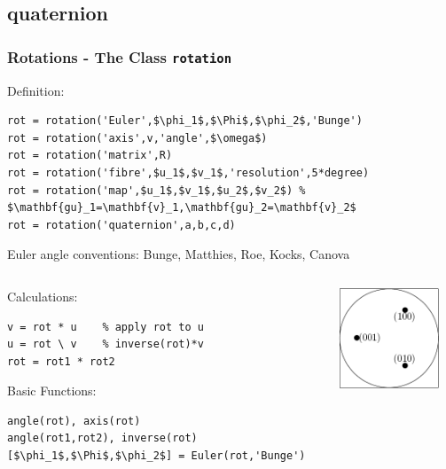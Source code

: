 \subsection*{quaternion}


\begin{frame}[fragile]
  \frametitle{Rotations - The \MTEX Class \texttt{\bf rotation}}

Definition:

\begin{lstlisting}[mathescape=true]
rot = rotation('Euler',$\phi_1$,$\Phi$,$\phi_2$,'Bunge')
rot = rotation('axis',v,'angle',$\omega$)
rot = rotation('matrix',R)
rot = rotation('fibre',$u_1$,$v_1$,'resolution',5*degree)
rot = rotation('map',$u_1$,$v_1$,$u_2$,$v_2$) % $\mathbf{gu}_1=\mathbf{v}_1,\mathbf{gu}_2=\mathbf{v}_2$
rot = rotation('quaternion',a,b,c,d)
\end{lstlisting}

Euler angle conventions: Bunge, Matthies, Roe, Kocks, Canova


\begin{columns}
  \begin{column}{8.5cm}

    Calculations:

\begin{lstlisting}
v = rot * u    % apply rot to u
u = rot \ v    % inverse(rot)*v
rot = rot1 * rot2
\end{lstlisting}

    Basic Functions:

\begin{lstlisting}[mathescape=true]
angle(rot), axis(rot)
angle(rot1,rot2), inverse(rot)
[$\phi_1$,$\Phi$,$\phi_2$] = Euler(rot,'Bunge')
\end{lstlisting}


  \end{column}

  \begin{column}{3cm}
    \includegraphics[width=3cm]{pic/quaternion}
  \end{column}

\end{columns}
\end{frame}



